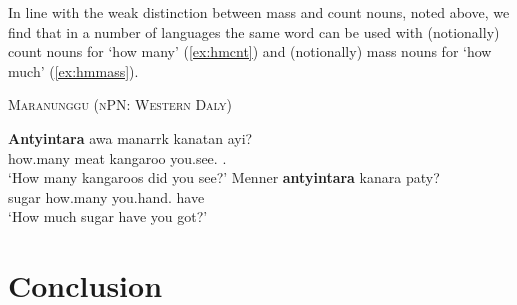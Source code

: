 \documentclass[12pt,egregdoesnotlikesansseriftitles]{scrartcl}
\begin{document}
In line with the weak distinction between mass and count nouns, noted above, we find that in a number of languages the same word can be used with (notionally) count nouns for `how many' (\ref{ex:hmcnt}) and (notionally) mass nouns for `how much' (\ref{ex:hmmass}).
\begin{exe}
  \ex\textsc{Maranunggu (nPN: Western Daly)}\hfill {}
  \begin{xlist}
    \ex\label{ex:hmcnt}\gll \textbf{Antyintara} awa manarrk kanatan ayi?\\
    how.many meat kangaroo you.see.\Nfut{} \Pst.\Aux\\
    `How many kangaroos did you see?'
    \ex\label{ex:hmmass}\gll Menner \textbf{antyintara} kanara paty?\\
    sugar how.many you.hand.\Nfut{} have\\
    `How much sugar have you got?'
  \end{xlist}
\end{exe}

\section{Conclusion}

\printbibliography
\end{document}

